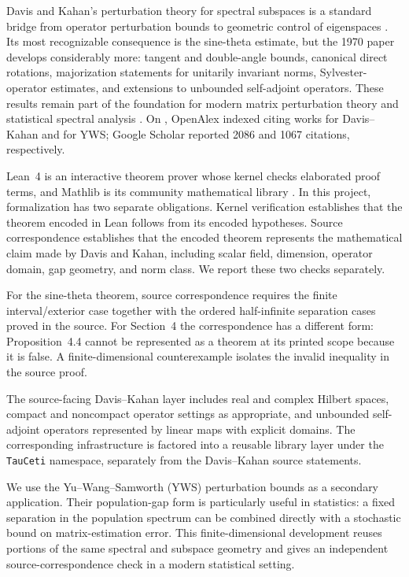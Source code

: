 \documentclass[11pt]{article}
\newcommand{\GoogleScholarDavisKahanCitations}{2086}
\newcommand{\GoogleScholarYuWangSamworthCitations}{1067}
\begin{document}
Davis and Kahan's perturbation theory for spectral subspaces is a standard
bridge from operator perturbation bounds to geometric control of eigenspaces
\citep{davis1970rotation,kato1976perturbation,stewart1990matrix}.  Its most
recognizable consequence is the sine-theta estimate, but the 1970 paper develops
considerably more: tangent and double-angle bounds, canonical direct rotations,
majorization statements for unitarily invariant norms, Sylvester-operator
estimates, and extensions to unbounded self-adjoint operators.  These results
remain part of the foundation for modern matrix perturbation theory and
statistical spectral analysis \citep{wedin1972perturbation,chen2021spectral}.
On \OpenAlexRetrievedDate{}, OpenAlex indexed
\OpenAlexDavisKahanCitations{} citing works for Davis--Kahan and
\OpenAlexYuWangSamworthCitations{} for YWS; Google Scholar reported
\GoogleScholarDavisKahanCitations{} and
\GoogleScholarYuWangSamworthCitations{} citations, respectively.

Lean~4 is an interactive theorem prover whose kernel checks elaborated proof
terms, and Mathlib is its community mathematical library
\citep{demoura2021lean4,mathlib2020}.  In this project, formalization has two
separate obligations.  Kernel verification establishes that the theorem encoded
in Lean follows from its encoded hypotheses.  Source correspondence establishes
that the encoded theorem represents the mathematical claim made by Davis and
Kahan, including scalar field, dimension, operator domain, gap geometry, and
norm class.  We report these two checks separately.

For the sine-theta theorem, source correspondence requires the finite
interval/exterior case together with the ordered half-infinite separation cases
proved in the source.  For Section~4 the correspondence has a different form:
Proposition~4.4 cannot be represented as a theorem at its printed scope because
it is false.  A finite-dimensional counterexample isolates the invalid
inequality in the source proof.

The source-facing Davis--Kahan layer includes real and complex Hilbert spaces,
compact and noncompact operator settings as appropriate, and unbounded
self-adjoint operators represented by linear maps with explicit domains.  The corresponding
infrastructure is factored into a reusable library layer under the
\texttt{TauCeti} namespace, separately from the Davis--Kahan source statements.

We use the Yu--Wang--Samworth (YWS) perturbation bounds
\citep{yu2015davis} as a secondary application.  Their population-gap form is
particularly useful in statistics: a fixed separation in the population
spectrum can be combined directly with a stochastic bound on matrix-estimation
error.  This finite-dimensional development reuses portions of the same
spectral and subspace geometry and gives an independent source-correspondence
check in a modern statistical setting.
\end{document}
